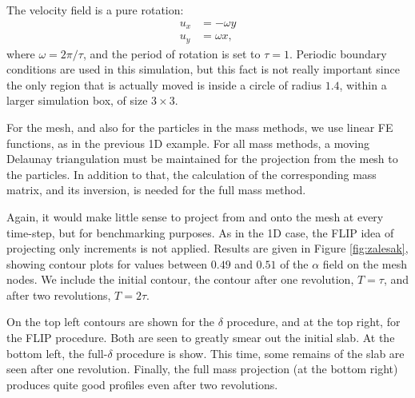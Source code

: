 \documentclass{ws-ijcm}
\begin{document}
The velocity field is a pure rotation:
\begin{align}
  u_x &= -\omega y\\
  u_y &=  \omega x ,
\end{align}
where $\omega=2\pi/\tau$, and the period of rotation is set to
$\tau=1$.  Periodic boundary conditions are used in this simulation,
but this fact is not really important since the only region that is
actually moved is inside a circle of radius $1.4$, within a larger
simulation box, of size $3 \times 3$.

For the mesh, and also for the particles in the mass methods, we use
linear FE functions, as in the previous 1D example.  For all mass
methods, a moving Delaunay triangulation must be maintained for the
projection from the mesh to the particles. In addition to that, the
calculation of the corresponding mass matrix, and its inversion, is
needed for the full mass method.

Again, it would make little sense to project from and onto the mesh at
every time-step, but for benchmarking purposes.  As in the 1D case,
the FLIP idea of projecting only increments is not applied. Results
are given in Figure \ref{fig:zalesak}, showing contour plots for
values between $0.49$ and $0.51$ of the $\alpha$ field on the mesh
nodes.  We include the initial contour, the contour after one
revolution, $T=\tau$, and after two revolutions, $T=2\tau$.

On the top left contours are shown for the $\delta$ procedure, and at
the top right, for the FLIP procedure. Both are seen to greatly smear
out the initial slab. At the bottom left, the full-$\delta$ procedure
is show. This time, some remains of the slab are seen after one
revolution. Finally, the full mass projection (at the bottom right)
produces quite good profiles even after two revolutions.


\end{document}
